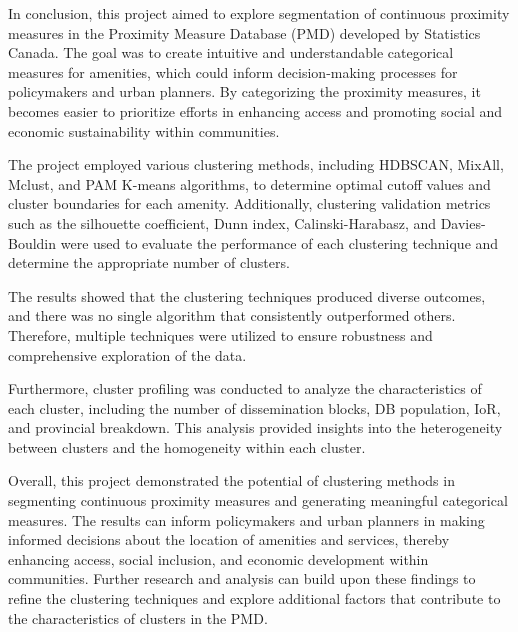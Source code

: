 \documentclass[11pt, a4paper]{article}
\begin{document}
In conclusion, this project aimed to explore segmentation of continuous proximity measures in the Proximity Measure Database (PMD) developed by Statistics Canada. The goal was to create intuitive and understandable categorical measures for amenities, which could inform decision-making processes for policymakers and urban planners. By categorizing the proximity measures, it becomes easier to prioritize efforts in enhancing access and promoting social and economic sustainability within communities.
\par
The project employed various clustering methods, including HDBSCAN, MixAll, Mclust, and PAM K-means algorithms, to determine optimal cutoff values and cluster boundaries for each amenity. Additionally, clustering validation metrics such as the silhouette coefficient, Dunn index, Calinski-Harabasz, and Davies-Bouldin were used to evaluate the performance of each clustering technique and determine the appropriate number of clusters.
\par
The results showed that the clustering techniques produced diverse outcomes, and there was no single algorithm that consistently outperformed others. Therefore, multiple techniques were utilized to ensure robustness and comprehensive exploration of the data.
\par
Furthermore, cluster profiling was conducted to analyze the characteristics of each cluster, including the number of dissemination blocks, DB population, IoR, and provincial breakdown. This analysis provided insights into the heterogeneity between clusters and the homogeneity within each cluster.
\par
Overall, this project demonstrated the potential of clustering methods in segmenting continuous proximity measures and generating meaningful categorical measures. The results can inform policymakers and urban planners in making informed decisions about the location of amenities and services, thereby enhancing access, social inclusion, and economic development within communities. Further research and analysis can build upon these findings to refine the clustering techniques and explore additional factors that contribute to the characteristics of clusters in the PMD.
\end{document}
